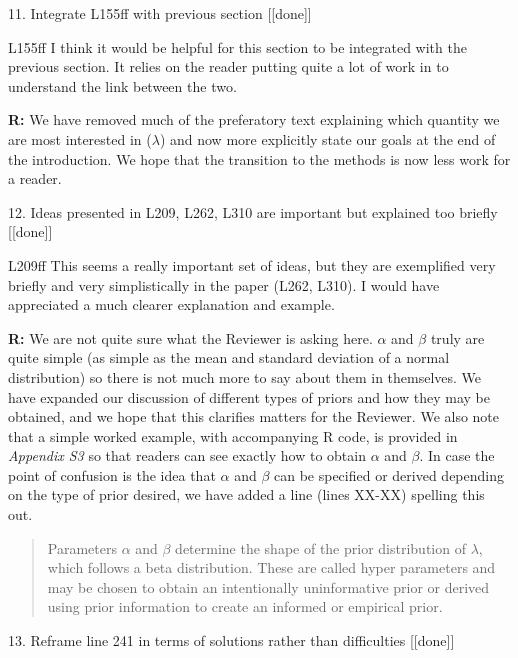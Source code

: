 \documentclass[12pt]{letter}
\newenvironment{refquote}{\bigskip \begin{it}}{\end{it}\smallskip}
\begin{document}
\begin{itemize}
	11. Integrate L155ff with previous section [[done]]

		\begin{refquote}
		L155ff I think it would be helpful for this section to be integrated with the previous section. It relies on the reader putting quite a lot of work in to understand the link between the two.
		\end{refquote}

		\textbf{R:} We have removed much of the preferatory text explaining which quantity we are most interested in ($\lambda$) and now more explicitly state our goals at the end of the introduction. We hope that the transition to the methods is now less work for a reader.


	12. Ideas presented in L209, L262, L310 are important but explained too briefly [[done]]

		\begin{refquote}
		L209ff This seems a really important set of ideas, but they are exemplified very briefly and very simplistically in the paper (L262, L310). I would have appreciated a much clearer explanation and example.
		\end{refquote}

		\textbf{R:} We are not quite sure what the Reviewer is asking here. $\alpha$ and $\beta$ truly are quite simple (as simple as the mean and standard deviation of a normal distribution) so there is not much more to say about them in themselves. We have expanded our discussion of different types of priors and how they may be obtained, and we hope that this clarifies matters for the Reviewer. We also note that a simple worked example, with accompanying R code, is provided in \emph{Appendix S3} so that readers can see exactly how to obtain $\alpha$ and $\beta$. In case the point of confusion is the idea that $\alpha$ and $\beta$ can be specified or derived depending on the type of prior desired, we have added a line (lines XX-XX) spelling this out.

		\begin{quotation}
			Parameters $\alpha$ and $\beta$ determine the shape of the prior distribution of $\lambda$, which follows a beta distribution. These are called hyper parameters and may be chosen to obtain an intentionally uninformative prior or derived using prior information to create an informed or empirical prior. 
			\end{quotation}


	13. Reframe line 241 in terms of solutions rather than difficulties [[done]]


\end{itemize}
\end{document}
